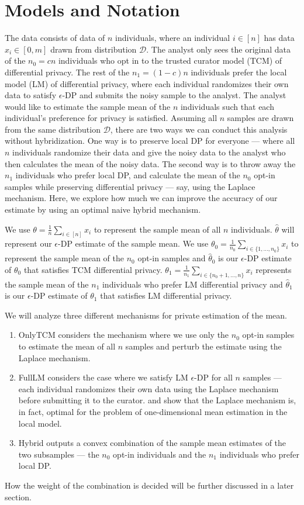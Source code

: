 \documentclass{article}
\theoremstyle{plain}
\begin{document}
\section{Models and Notation}
The data consists of data of $n$ individuals, where an individual $i \in [n]$ has data $x_i \in [0, m]$ drawn from distribution $\mathcal{D}$. The analyst only sees the original data of the $n_0 = c n$ individuals who opt in to the trusted curator model (TCM) of differential privacy. The rest of the $n_1 = (1-c) n$ individuals prefer the local model (LM) of differential privacy, where each individual randomizes their own data to satisfy $\epsilon$-DP and submits the noisy sample to the analyst. The analyst would like to estimate the sample mean of the $n$ individuals such that each individual's preference for privacy is satisfied. Assuming all $n$ samples are drawn from the same distribution $\mathcal{D}$, there are two ways we can conduct this analysis without hybridization. One way is to preserve local DP for everyone — where all $n$ individuals randomize their data and give the noisy data to the analyst who then calculates the mean of the noisy data. The second way is to throw away the $n_1$ individuals who prefer local DP, and calculate the mean of the $n_0$ opt-in samples while preserving differential privacy — say, using the Laplace mechanism. Here, we explore how much we can improve the accuracy of our estimate by using an optimal naive hybrid mechanism. 

We use $\theta = \frac{1}{n}\sum_{i \in [n]}x_i$ to represent the sample mean of all $n$ individuals. $\hat{\theta}$ will represent our $\epsilon$-DP estimate of the sample mean. We use $\theta_0 = \frac{1}{n_0}\sum_{i \in \{1, \dots, n_0\}} x_i$ to represent the sample mean of the $n_0$ opt-in samples and $\hat{\theta}_0$ is our $\epsilon$-DP estimate of $\theta_0$ that satisfies TCM differential privacy. $\theta_1 = \frac{1}{n_1}\sum_{i \in \{n_0+1, \dots, n\}} x_i$ represents the sample mean of the $n_1$ individuals who prefer LM differential privacy and $\hat{\theta}_1$ is our $\epsilon$-DP estimate of $\theta_1$ that satisfies LM differential privacy. 

We will analyze three different mechanisms for private estimation of the mean. 
\begin{enumerate}
\item OnlyTCM considers the mechanism where we use only the $n_0$ opt-in samples to estimate the mean of all $n$ samples and perturb the estimate using the Laplace mechanism. 
\item FullLM considers the case where we satisfy LM $\epsilon$-DP for all $n$ samples — each individual randomizes their own data using the Laplace mechanism before submitting it to the curator. \cite{duchi} and \cite{dky18} show that the Laplace mechanism is, in fact, optimal for the problem of one-dimensional mean estimation in the local model. 
\item Hybrid outputs a convex combination of the sample mean estimates of the two subsamples — the $n_0$ opt-in individuals and the $n_1$ individuals who prefer local DP.
\end{enumerate}
How the weight of the combination is decided will be further discussed in a later section. 
\end{document}

